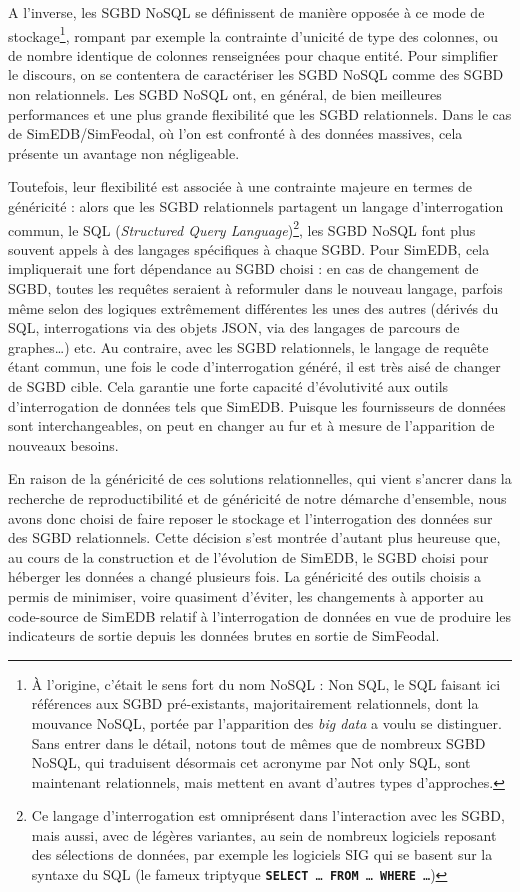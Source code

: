A l'inverse, les SGBD NoSQL se définissent de manière opposée à ce mode de stockage\footnote{
	À l'origine, c'était le sens fort du nom \og NoSQL \fg{} : Non SQL, le SQL faisant ici références aux SGBD pré-existants, majoritairement relationnels, dont la mouvance NoSQL, portée par l'apparition des \og \textit{big data} \fg{} a voulu se distinguer.
	Sans entrer dans le détail, notons tout de mêmes que de nombreux SGBD NoSQL, qui traduisent désormais cet acronyme par \og Not only SQL\fg{}, sont maintenant relationnels, mais mettent en avant d'autres types d'approches.
}, rompant par exemple la contrainte d'unicité de type des colonnes, ou de nombre identique de colonnes renseignées pour chaque entité. Pour simplifier le discours, on se contentera de caractériser les SGBD NoSQL comme des SGBD non relationnels.
Les SGBD NoSQL ont, en général, de bien meilleures performances et une plus grande flexibilité que les SGBD relationnels.
Dans le cas de SimEDB/SimFeodal, où l'on est confronté à des données massives, cela présente un avantage non négligeable.

Toutefois, leur flexibilité est associée à une contrainte majeure en termes de généricité : alors que les SGBD relationnels partagent un langage d'interrogation commun, le SQL (\textit{Structured Query Language})\footnote{
	Ce langage d'interrogation est omniprésent dans l'interaction avec les SGBD, mais aussi, avec de légères variantes, au sein de nombreux logiciels reposant des sélections de données, par exemple les logiciels SIG qui se basent sur la syntaxe du SQL (le fameux triptyque \texttt{\textbf{SELECT} \ldots~\textbf{FROM} \ldots{} \textbf{WHERE} \ldots})
}, les SGBD NoSQL font plus souvent appels à des langages spécifiques à chaque SGBD.
Pour SimEDB, cela impliquerait une fort dépendance au SGBD choisi : en cas de changement de SGBD, toutes les requêtes seraient à reformuler dans le nouveau langage, parfois même selon des logiques extrêmement différentes les unes des autres (dérivés du SQL, interrogations via des objets JSON, via des langages de parcours de graphes\ldots{}) etc.
Au contraire, avec les SGBD relationnels, le langage de requête étant commun, une fois le code d'interrogation généré, il est très aisé de changer de SGBD cible.
Cela garantie une forte capacité d'évolutivité aux outils d'interrogation de données tels que SimEDB.
Puisque les fournisseurs de données sont interchangeables, on peut en changer au fur et à mesure de l'apparition de nouveaux besoins.

En raison de la généricité de ces solutions relationnelles, qui vient s'ancrer dans la recherche de reproductibilité et de généricité de notre démarche d'ensemble, nous avons donc choisi de faire reposer le stockage et l'interrogation des données sur des SGBD relationnels.
Cette décision s'est montrée d'autant plus heureuse que, au cours de la construction et de l'évolution de SimEDB, le SGBD choisi pour héberger les données a changé plusieurs fois.
La généricité des outils choisis a permis de minimiser, voire quasiment d'éviter, les changements à apporter au code-source de SimEDB relatif à l'interrogation de données en vue de produire les indicateurs de sortie depuis les données brutes en sortie de SimFeodal.


